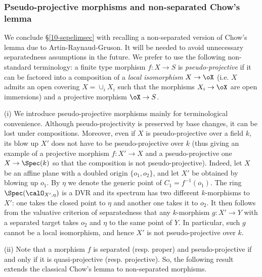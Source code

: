 \documentclass[10pt]{../fichiers-configuration-latex/smfart}
\begin{document}
\subsubsection{Pseudo-projective morphisms and non-separated Chow's lemma}\label{10-chowsec}
We conclude \S\ref{10-sepelimsec} with recalling a non-separated version of Chow's lemma
due to Artin-Raynaud-Gruson. It will be needed to avoid unnecessary separatedness
assumptions in the future. We prefer to use the following non-standard terminology:
a finite type morphism $f{\colon}X\to S$ is {\em pseudo-projective} if it can be factored
into a composition of a {\em local isomorphism} $X\to\oX$ (i.e. $X$ admits an open covering
$X=\cup_i X_i$ such that the morphisms $X_i\to\oX$ are open immersions) and a projective morphism $\oX\to S$.

\begin{remark2}\label{10-chowrem}
(i) We introduce pseudo-projective morphisms mainly for terminological convenience.
Although pseudo-projectivity is preserved by base changes, it can be lost under
compositions. Moreover, even if $X$ is pseudo-projective over a field $k$, its
blow up $X'$ does not have to be pseudo-projective over $k$ (thus giving an example
of a projective morphism $f{\colon}X'\to X$ and a pseudo-projective one $X\to\Spec(k)$
so that the composition is not pseudo-projective). Indeed, let $X$ be an affine plane
with a doubled origin $\{o_1,o_2\}$, and let $X'$ be obtained by blowing up $o_1$. By
$\eta$ we denote the generic point of $C_1=f^{-1}(o_1)$. The ring $\Spec(\calO_{X',\eta})$
is a DVR and its spectrum has two different $k$-morphisms to $X'$: one takes the closed point
to $\eta$ and another one takes it to $o_2$. It then follows from the valuative criterion of
separatedness that any $k$-morphism $g{\colon}X'\to Y$ with a separated target takes $o_2$
and $\eta$ to the same point of $Y$. In particular, such $g$ cannot be a local isomorphism,
and hence $X'$ is not pseudo-projective over $k$.

(ii) Note that a morphism $f$ is separated (resp. proper) and pseudo-projective if and only
if it is quasi-projective (resp. projective). So, the following result extends the classical
Chow's lemma to non-separated morphisms.
\end{remark2}
\end{document}
